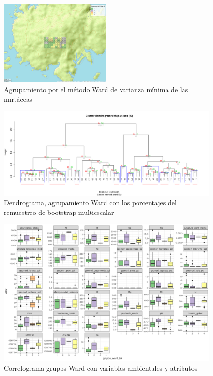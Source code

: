 \documentclass[11pt,]{article}
\begin{document}
\begin{figure}
\centering
\includegraphics[width=0.50000\textwidth]{mapa_ward_k4.png}
\caption{Agrupamiento por el método Ward de varianza mínima de las
mirtáceas \label{fig:mapa_ward}}
\end{figure}

\begin{figure}
\centering
\includegraphics{bootstrap_Ward.png}
\caption{Dendrograma, agrupamiento Ward con los porcentajes del
remuestreo de bootstrap multiescalar \label{fig:bootstrap_multiescalar}}
\end{figure}

\begin{figure}
\centering
\includegraphics{correlograma_wardyvariablesambientales.png}
\caption{Correlograma grupos Ward con variables ambientales y atributos
\label{fig:ward_con_variables}}
\end{figure}
\end{document}
